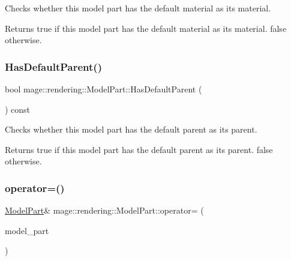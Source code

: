 Checks whether this model part has the default material as its material.

\begin{DoxyReturn}{Returns}
{\ttfamily true} if this model part has the default material as its material. {\ttfamily false} otherwise. 
\end{DoxyReturn}
\hypertarget{structmage_1_1rendering_1_1_model_part_ac452d6bba03decae31646eec0329c4ab}{}\label{structmage_1_1rendering_1_1_model_part_ac452d6bba03decae31646eec0329c4ab} 
\subsubsection{\texorpdfstring{Has\+Default\+Parent()}{HasDefaultParent()}}
{\footnotesize\ttfamily bool mage\+::rendering\+::\+Model\+Part\+::\+Has\+Default\+Parent (\begin{DoxyParamCaption}{ }\end{DoxyParamCaption}) const\hspace{0.3cm}{\ttfamily [noexcept]}}

Checks whether this model part has the default parent as its parent.

\begin{DoxyReturn}{Returns}
{\ttfamily true} if this model part has the default parent as its parent. {\ttfamily false} otherwise. 
\end{DoxyReturn}
\hypertarget{structmage_1_1rendering_1_1_model_part_a9d6c372839b9493df4b432d8ba2613dc}{}\label{structmage_1_1rendering_1_1_model_part_a9d6c372839b9493df4b432d8ba2613dc} 
\subsubsection{\texorpdfstring{operator=()}{operator=()}\hspace{0.1cm}{\footnotesize\ttfamily [1/2]}}
{\footnotesize\ttfamily \hyperlink{structmage_1_1rendering_1_1_model_part}{Model\+Part}\& mage\+::rendering\+::\+Model\+Part\+::operator= (\begin{DoxyParamCaption}\item[{const \hyperlink{structmage_1_1rendering_1_1_model_part}{Model\+Part} \&}]{model\+\_\+part }\end{DoxyParamCaption})\hspace{0.3cm}{\ttfamily [default]}}

